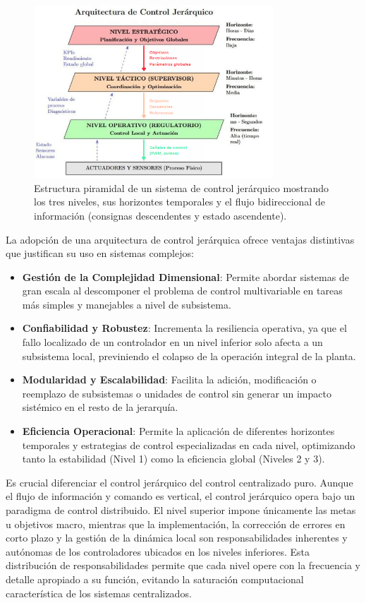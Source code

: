 \begin{figure}[H]
    \centering
    \includegraphics[width=0.8\textwidth]{img/jerarquia_control.png}
    \caption{Estructura piramidal de un sistema de control jerárquico mostrando los tres niveles, sus horizontes temporales y el flujo bidireccional de información (consignas descendentes y estado ascendente).}
    \label{fig:jerarquia_control}
\end{figure}
La adopción de una arquitectura de control jerárquica ofrece ventajas distintivas que justifican su uso en sistemas complejos:
\begin{itemize}[label=$\bullet$]
    \item \textbf{Gestión de la Complejidad Dimensional}: Permite abordar sistemas de gran escala al descomponer el problema de control multivariable en tareas más simples y manejables a nivel de subsistema.
    \item \textbf{Confiabilidad y Robustez}: Incrementa la resiliencia operativa, ya que el fallo localizado de un controlador en un nivel inferior solo afecta a un subsistema local, previniendo el colapso de la operación integral de la planta.
    \item \textbf{Modularidad y Escalabilidad}: Facilita la adición, modificación o reemplazo de subsistemas o unidades de control sin generar un impacto sistémico en el resto de la jerarquía.
    \item \textbf{Eficiencia Operacional}: Permite la aplicación de diferentes horizontes temporales y estrategias de control especializadas en cada nivel, optimizando tanto la estabilidad (Nivel 1) como la eficiencia global (Niveles 2 y 3).
\end{itemize}
Es crucial diferenciar el control jerárquico del control centralizado puro. Aunque el flujo de información y comando es vertical, el control jerárquico opera bajo un paradigma de control distribuido. El nivel superior impone únicamente las metas u objetivos macro, mientras que la implementación, la corrección de errores en corto plazo y la gestión de la dinámica local son responsabilidades inherentes y autónomas de los controladores ubicados en los niveles inferiores. Esta distribución de responsabilidades permite que cada nivel opere con la frecuencia y detalle apropiado a su función, evitando la saturación computacional característica de los sistemas centralizados.

